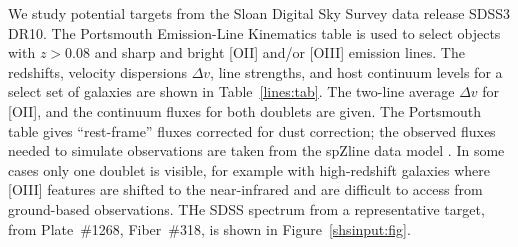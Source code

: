 \documentclass[preprint2, 10pt]{aastex}
\begin{document}
We study potential targets from the Sloan Digital Sky Survey data release SDSS3 DR10.  The  Portsmouth Emission-Line Kinematics table \citep{2013MNRAS.431.1383T}  is used to select
objects 
with $z>0.08$
and sharp and bright [OII] and/or [OIII] emission lines.
The redshifts, velocity dispersions $\Delta v$, line strengths, and host continuum levels for a select set of galaxies are shown in Table~\ref{lines:tab}. 
The two-line average $\Delta v$ for [OII], and the continuum fluxes for both doublets  are given.
The Portsmouth table  gives ``rest-frame'' fluxes corrected for dust correction;
the observed fluxes needed to simulate observations are taken from the spZline data model
\citep{2012AJ....144..144B}.  In some cases only one doublet is visible, for example with high-redshift galaxies where [OIII] features are shifted to the near-infrared and are difficult to access from ground-based observations.
THe SDSS spectrum from a representative 
target, from Plate~\#1268, Fiber~\#318, is shown in Figure~\ref{shsinput:fig}. 
\end{document}
